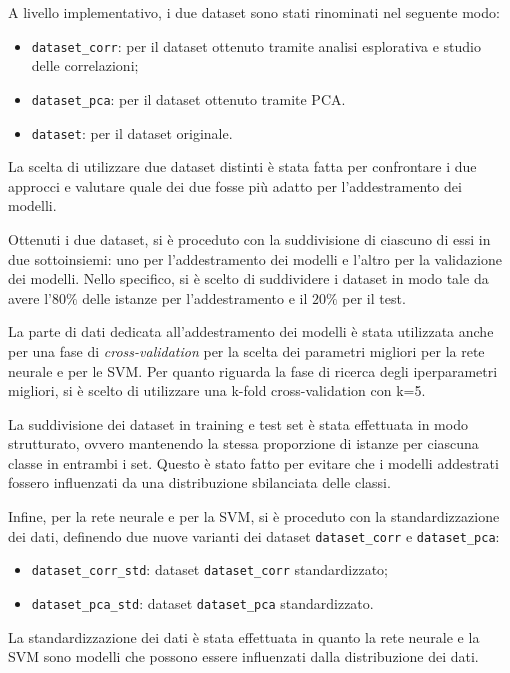 A livello implementativo, i due dataset sono stati rinominati nel seguente modo:
\begin{itemize}
      \item \texttt{dataset\_corr}: per il dataset ottenuto tramite analisi
            esplorativa e studio delle correlazioni;
      \item \texttt{dataset\_pca}: per il dataset ottenuto tramite PCA.
      \item \texttt{dataset}: per il dataset originale.
\end{itemize}

La scelta di utilizzare due dataset distinti è stata fatta per confrontare
i due approcci e valutare quale dei due fosse più adatto per l'addestramento
dei modelli.

Ottenuti i due dataset, si è proceduto con la suddivisione di ciascuno di essi
in due sottoinsiemi: uno per l'addestramento dei modelli e l'altro per la
validazione dei modelli. Nello specifico, si è scelto di suddividere i dataset
in modo tale da avere l'$80\%$ delle istanze per l'addestramento e il $20\%$ per
il test.

La parte di dati dedicata all'addestramento dei modelli è stata utilizzata anche
per una fase di \textit{cross-validation} per la scelta dei parametri migliori
per la rete neurale e per le SVM. Per quanto riguarda la fase di ricerca degli
iperparametri migliori, si è scelto di utilizzare una k-fold cross-validation
con k=5.

La suddivisione dei dataset in training e test set è stata effettuata in modo
strutturato, ovvero mantenendo la stessa proporzione di istanze per ciascuna
classe in entrambi i set. Questo è stato fatto per evitare che i modelli
addestrati fossero influenzati da una distribuzione sbilanciata delle classi.

Infine, per la rete neurale e per la SVM, si è proceduto con la standardizzazione
dei dati, definendo due nuove varianti dei dataset \texttt{dataset\_corr} e
\texttt{dataset\_pca}:
\begin{itemize}
      \item \texttt{dataset\_corr\_std}: dataset \texttt{dataset\_corr} standardizzato;
      \item \texttt{dataset\_pca\_std}: dataset \texttt{dataset\_pca} standardizzato.
\end{itemize}

La standardizzazione dei dati è stata effettuata in quanto la rete neurale e
la SVM sono modelli che possono essere influenzati dalla distribuzione dei dati.

